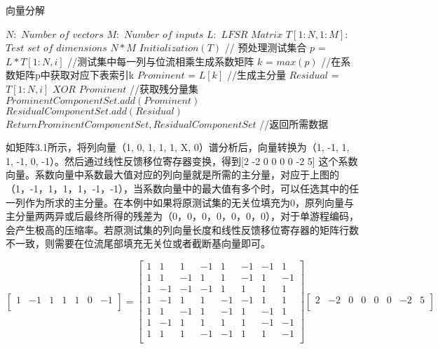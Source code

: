 \vspace{\baselineskip}
\begin{algorithm}[!h]
	\caption{向量分解}%
	\begin{algorithmic}%
        \STATE $N:$ $Number$ $of$ $vectors$
		\STATE $M:$ $Number$ $of$ $inputs$
        \STATE $L:$ $LFSR$ $Matrix$
        \STATE $T[1:N, 1:M]:$ $Test$ $set$ $of$ $dimensions$ $N*M$
        \STATE $Initialization( T )$     // 预处理测试集合
        \STATE $p$ = $L*T[1:N, i]$      //测试集中每一列与位流相乘生成系数矩阵
        \STATE $k$ = $max( p )$         //在系数矩阵p中获取对应下表索引k
		\ENDFOR
		\STATE $Prominent$ = $L[k]$ //生成主分量
        \STATE $Residual$ = $T[1:N, i]$ $XOR$ $Prominent$   //获取残分量集
        \STATE $ProminentComponentSet.add(Prominent)$
        \STATE $ResidualComponentSet.add(Residual)$
        \STATE $Return ProminentComponentSet, ResidualComponentSet$  //返回所需数据
	\end{algorithmic}
\end{algorithm}

如矩阵3.1所示，将列向量（1, 0, 1, 1, 1, X, 0）谱分析后，向量转换为（1, -1, 1, 1, -1, 0, -1）。然后通过线性反馈移位寄存器变换，得到[2 -2 0 0 0 0 -2 5] 这个系数向量。系数向量中系数最大值对应的列向量就是所需的主分量，对应于上图的（1，-1，1，1，1，-1，-1），当系数向量中的最大值有多个时，可以任选其中的任一列作为所求的主分量。在本例中如果将原测试集的无关位填充为0，原列向量与主分量两两异或后最终所得的残差为（0，0，0，0，0，0，0），对于单游程编码，会产生极高的压缩率。若原测试集的列向量长度和线性反馈移位寄存器的矩阵行数不一致，则需要在位流尾部填充无关位或者截断基向量即可。

\begin{equation}
\left[
\begin{array}{ccccccc}
   1& -1& 1& 1& 1& 0& -1\\
\end{array}
\right]
=
\left[
\begin{array}{cccccccc}
    1&   1&   1&-1&   1&-1&-1&   1\\
    1&   1&-1&   1&   1&-1&   1&-1\\
    1&-1&-1&-1&   1&   1&   1&   1\\
    1&-1&   1&   1&-1&-1&   1&   1\\
    1&   1&-1&   1&-1&   1&-1&   1\\
    1&-1&   1&   1&   1&   1&-1&-1\\
    1&   1&   1&-1&-1&   1&   1&-1\\
\end{array}
\right]
\left[
\begin{array}{cccccccc}
   2& -2& 0& 0& 0& 0& -2& 5\\
\end{array}
\right]
\end{equation}

